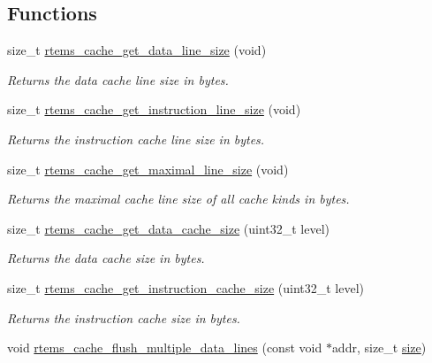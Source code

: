 \subsection*{Functions}
\begin{DoxyCompactItemize}
\item 
size\+\_\+t \mbox{\hyperlink{group__ClassicCache_gaf4dd0168871b3939eae1541c216eca31}{rtems\+\_\+cache\+\_\+get\+\_\+data\+\_\+line\+\_\+size}} (void)
\begin{DoxyCompactList}\small\item\em Returns the data cache line size in bytes. \end{DoxyCompactList}\item 
size\+\_\+t \mbox{\hyperlink{group__ClassicCache_gaef20a7d7cd4b22c17478ced466913d60}{rtems\+\_\+cache\+\_\+get\+\_\+instruction\+\_\+line\+\_\+size}} (void)
\begin{DoxyCompactList}\small\item\em Returns the instruction cache line size in bytes. \end{DoxyCompactList}\item 
size\+\_\+t \mbox{\hyperlink{group__ClassicCache_ga1083d01ae20fb51f2b65b2319c1831d6}{rtems\+\_\+cache\+\_\+get\+\_\+maximal\+\_\+line\+\_\+size}} (void)
\begin{DoxyCompactList}\small\item\em Returns the maximal cache line size of all cache kinds in bytes. \end{DoxyCompactList}\item 
size\+\_\+t \mbox{\hyperlink{group__ClassicCache_ga518a30758a99000e752ba02f04674749}{rtems\+\_\+cache\+\_\+get\+\_\+data\+\_\+cache\+\_\+size}} (uint32\+\_\+t level)
\begin{DoxyCompactList}\small\item\em Returns the data cache size in bytes. \end{DoxyCompactList}\item 
size\+\_\+t \mbox{\hyperlink{group__ClassicCache_ga726a484e646935c5ab2f948cefe5e851}{rtems\+\_\+cache\+\_\+get\+\_\+instruction\+\_\+cache\+\_\+size}} (uint32\+\_\+t level)
\begin{DoxyCompactList}\small\item\em Returns the instruction cache size in bytes. \end{DoxyCompactList}\item 
void \mbox{\hyperlink{group__ClassicCache_gab71809c2afd76e0d546b391d0105ca60}{rtems\+\_\+cache\+\_\+flush\+\_\+multiple\+\_\+data\+\_\+lines}} (const void $\ast$addr, size\+\_\+t \mbox{\hyperlink{sun4u_2tte_8h_a245260f6f74972558f61b85227df5aae}{size}})

\end{DoxyCompactItemize}
